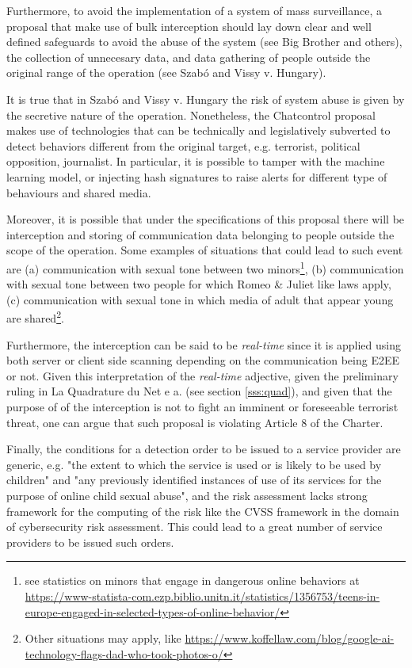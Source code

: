 Furthermore, to avoid the implementation of a system of mass surveillance, a proposal that make use of bulk interception should lay down clear and well defined safeguards to avoid the abuse of the system (see Big Brother and others), the collection of unnecesary data, and data gathering of people outside the original range of the operation (see Szabó and Vissy v. Hungary).

It is true that in Szabó and Vissy v. Hungary the risk of system abuse is given by the secretive nature of the operation. Nonetheless, the Chatcontrol proposal makes use of technologies that can be technically and legislatively subverted to detect behaviors different from the original target, e.g. terrorist, political opposition, journalist. In particular, it is possible to tamper with the machine learning model, or injecting hash signatures to raise alerts for different type of behaviours and shared media.

Moreover, it is possible that under the specifications of this proposal there will be interception and storing of communication data belonging to people outside the scope of the operation. Some examples of situations that could lead to such event are (a) communication with sexual tone between two minors\footnote{see statistics on minors that engage in dangerous online behaviors at \url{https://www-statista-com.ezp.biblio.unitn.it/statistics/1356753/teens-in-europe-engaged-in-selected-types-of-online-behavior/}}, (b) communication with sexual tone between two people for which Romeo \& Juliet like laws apply, (c) communication with sexual tone in which media of adult that appear young are shared\footnote{Other situations may apply, like \url{https://www.koffellaw.com/blog/google-ai-technology-flags-dad-who-took-photos-o/}}. 

Furthermore, the interception can be said to be \textit{real-time} since it is applied using both server or client side scanning depending on the communication being E2EE or not. Given this interpretation of the \textit{real-time} adjective, given the preliminary ruling in La Quadrature du Net e a. (see section \ref{sss:quad}), and given that the purpose of of the interception is not to fight an imminent or foreseeable terrorist threat, one can argue that such proposal is violating Article 8 of the Charter.

Finally, the conditions for a detection order to be issued to a service provider are generic, e.g. "the extent to which the service is used or is likely to be used by children" and "any previously identified instances of use of its services for the purpose of
online child sexual abuse"\cite{eu2023chatcontrol}, and the risk assessment lacks strong framework for the computing of the risk like the CVSS framework in the domain of cybersecurity risk assessment. This could lead to a great number of service providers to be issued such orders.

